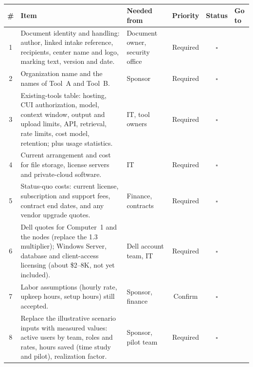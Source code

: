 
\\[4pt]

{\footnotesize
\begin{xltabular}{\textwidth}{@{}c Y{1.5} Y{0.7} c c Y{0.8}@{}}
  \toprule
  \# & Item & Needed from & Priority & Status & Go to \\
  \midrule
   & Document identity and handling: author, linked intake reference, recipients, center name and logo, marking text, version and date. & Document owner, security office & Required & $\square$ &  \\
  2 & Organization name and the names of Tool~A and Tool~B. & Sponsor & Required & $\square$ &  \\
  3 & Existing-tools table: hosting, CUI authorization, model, context window, output and upload limits, API, retrieval, rate limits, cost model, retention; plus usage statistics. & IT, tool owners & Required & $\square$ &  \\
  4 & Current arrangement and cost for file storage, license servers and private-cloud software. & IT & Required & $\square$ &  \\
  5 & Status-quo costs: current license, subscription and support fees, contract end dates, and any vendor upgrade quotes. & Finance, contracts & Required & $\square$ &  \\
  6 & Dell quotes for Computer~1 and the nodes (replace the 1.3 multiplier); Windows Server, database and client-access licensing (about \$2--8K, not yet included). & Dell account team, IT & Required & $\square$ &  \\
  7 & Labor assumptions (hourly rate, upkeep hours, setup hours) still accepted. & Sponsor, finance & Confirm & $\square$ &  \\
  8 & Replace the illustrative scenario inputs with measured values: active users by team, roles and rates, hours saved (time study and pilot), realization factor. & Sponsor, pilot team & Required & $\square$ &  \\

\end{xltabular}}
